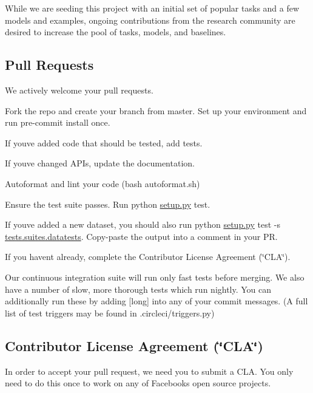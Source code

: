 While we are seeding this project with an initial set of popular tasks and a few models and examples, ongoing contributions from the research community are desired to increase the pool of tasks, models, and baselines.

\subsection*{Pull Requests}

We actively welcome your pull requests.


\begin{DoxyEnumerate}
\item Fork the repo and create your branch from {\ttfamily master}. Set up your environment and run {\ttfamily pre-\/commit install} once.
\item If you\textquotesingle{}ve added code that should be tested, add tests.
\item If you\textquotesingle{}ve changed A\+P\+Is, update the documentation.
\item Autoformat and lint your code ({\ttfamily bash autoformat.\+sh})
\item Ensure the test suite passes. Run {\ttfamily python \hyperlink{setup_8py}{setup.\+py} test}.
\item If you\textquotesingle{}ve added a new dataset, you should also run {\ttfamily python \hyperlink{setup_8py}{setup.\+py} test -\/s \hyperlink{namespacetests_1_1suites_a1e7ee73a4d3645058850bc743ad6b668}{tests.\+suites.\+datatests}}. Copy-\/paste the output into a comment in your PR.
\item If you haven\textquotesingle{}t already, complete the Contributor License Agreement (\char`\"{}\+C\+L\+A\char`\"{}).
\end{DoxyEnumerate}

Our continuous integration suite will run only fast tests before merging. We also have a number of slow, more thorough tests which run nightly. You can additionally run these by adding {\ttfamily \mbox{[}long\mbox{]}} into any of your commit messages. (A full list of test triggers may be found in {\ttfamily .circleci/triggers.\+py})

\subsection*{Contributor License Agreement (\char`\"{}\+C\+L\+A\char`\"{})}

In order to accept your pull request, we need you to submit a C\+LA. You only need to do this once to work on any of Facebook\textquotesingle{}s open source projects.

